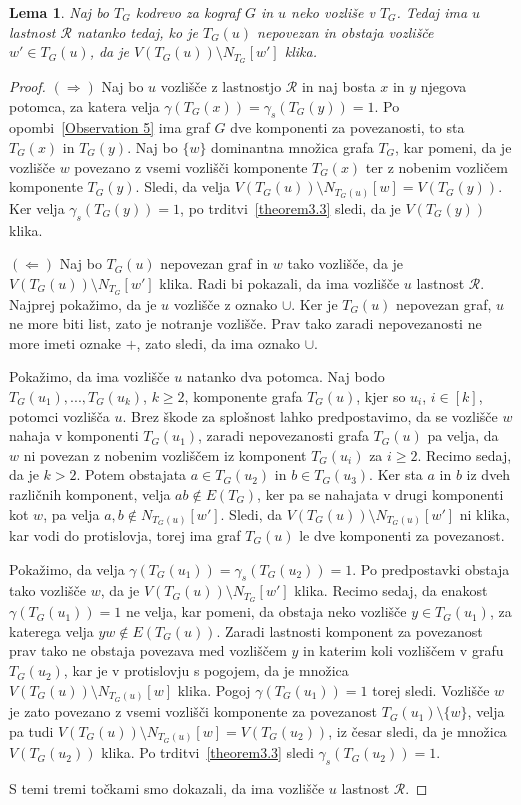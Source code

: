 \documentclass[12pt,a4paper,twoside]{article}
\theoremstyle{definition} %
\theoremstyle{plain} %
\newtheorem{lema}[definicija]{Lema}
\numberwithin{equation}{section}  %
\begin{document}
\begin{lema}\label{Lema1}
Naj bo $T_G$ kodrevo za kograf $G$ in $u$ neko vozliše v $T_G$. Tedaj ima $u$ lastnost $\mathcal{R}$ natanko tedaj, ko je $T_G(u)$ nepovezan in obstaja vozlišče $w'\in T_G(u)$, da je $V(T_G(u)) \setminus N_{T_G}[w']$ klika.
\end{lema}
\begin{proof}
$(\Rightarrow)$ Naj bo $u$ vozlišče z lastnostjo $\mathcal{R}$ in naj bosta $x$ in $y$ njegova potomca, za katera velja $\gamma(T_G(x)) = \gamma_s(T_G(y)) = 1$. Po opombi~\ref{Observation 5} ima graf $G$ dve komponenti za povezanosti, to sta $T_G(x)$ in $T_G(y)$. Naj bo $\{w\}$ dominantna množica grafa $T_G$, kar pomeni, da je vozlišče $w$ povezano z vsemi vozlišči komponente $T_G(x)$ ter z nobenim vozličem komponente $T_G(y)$. Sledi, da velja $V(T_G(u)) \setminus N_{T_G(u)}[w] = V(T_G(y))$. Ker velja $\gamma_s(T_G(y))=1$, po trditvi~\ref{theorem3.3} sledi, da je $V(T_G(y))$ klika. 

\medskip
$(\Leftarrow)$ Naj bo $T_G(u)$ nepovezan graf in $w$ tako vozlišče, da je $V(T_G(u)) \setminus N_{T_G}[w']$ klika. Radi bi pokazali, da ima vozlišče $u$ lastnost $\mathcal{R}$.
Najprej pokažimo, da je $u$ vozlišče z oznako $\cup$. Ker je $T_G(u)$ nepovezan graf, $u$ ne more biti list, zato je notranje vozlišče. Prav tako zaradi nepovezanosti ne more imeti oznake $+$, zato sledi, da ima oznako $\cup$.

Pokažimo, da ima vozlišče $u$ natanko dva potomca. Naj bodo $T_G(u_1),...,T_G(u_k)$, $k \geq 2$, komponente grafa $T_G(u)$, kjer so $u_i$, $i \in [k]$, potomci vozlišča $u$. Brez škode za splošnost lahko predpostavimo, da se vozlišče $w$ nahaja v komponenti $T_G(u_1)$, zaradi nepovezanosti grafa $T_G(u)$ pa velja, da $w$ ni povezan z nobenim vozliščem iz komponent $T_G(u_i)$ za $i \geq 2$. Recimo sedaj, da je $k > 2$. Potem obstajata $a \in T_G(u_2)$ in $b \in T_G(u_3)$. Ker sta $a$ in $b$ iz dveh različnih komponent, velja $ab \not\in E(T_G)$, ker pa se nahajata v drugi komponenti kot $w$, pa velja $a,b \not\in N_{T_G(u)}[w']$. Sledi, da $V(T_G(u)) \setminus N_{T_G(u)}[w']$ ni klika, kar vodi do protislovja, torej ima graf $T_G(u)$ le dve komponenti za povezanost.

Pokažimo, da velja $\gamma(T_G(u_1)) = \gamma_s(T_G(u_2)) = 1$. Po predpostavki obstaja tako vozlišče $w$, da je $V(T_G(u)) \setminus N_{T_G}[w']$ klika. Recimo sedaj, da enakost $\gamma(T_G(u_1)) = 1$ ne velja, kar pomeni, da obstaja neko vozlišče $y \in T_G(u_1)$, za katerega velja $yw \not\in E(T_G(u))$. Zaradi lastnosti komponent za povezanost prav tako ne obstaja povezava med vozliščem $y$ in katerim koli vozliščem v grafu $T_G(u_2)$, kar je v protislovju s pogojem, da je množica $V(T_G(u)) \setminus N_{T_G(u)}[w]$ klika. Pogoj $\gamma(T_G(u_1)) = 1$ torej sledi. Vozlišče $w$ je zato povezano z vsemi vozlišči komponente za povezanost $T_G(u_1) \setminus \{w\}$, velja pa tudi $V(T_G(u)) \setminus N_{T_G(u)}[w] = V(T_G(u_2))$, iz česar sledi, da je množica $V(T_G(u_2))$ klika. Po trditvi~\ref{theorem3.3} sledi $\gamma_s(T_G(u_2)) = 1$.

S temi tremi točkami smo dokazali, da ima vozlišče $u$ lastnost $\mathcal{R}$.
\end{proof}
\end{document}
